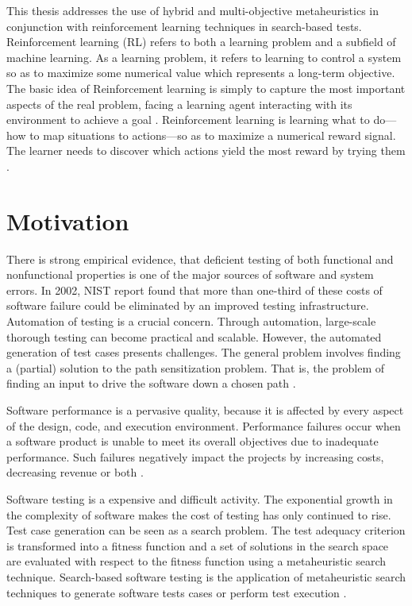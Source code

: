 \documentclass{report}
\begin{document}
This thesis addresses the use of hybrid and multi-objective metaheuristics in conjunction with reinforcement learning techniques in search-based tests. Reinforcement learning (RL) refers to both a learning problem and a subfield of machine learning. As a learning problem, it refers to learning to control a system so as to maximize some numerical value which represents a long-term objective. The basic idea of Reinforcement learning  is simply to capture the most important aspects of the real problem, facing a learning agent interacting with its environment to achieve a goal \cite{Sutton2012}. Reinforcement learning is learning what to do—how to map situations to actions—so as to maximize a numerical reward signal. The learner needs to discover which actions yield the most reward by trying them \cite{Sutton2012}.



\section{Motivation}

There is strong empirical evidence, that deficient
testing of both functional and nonfunctional properties
is one of the major sources of software and system errors. In 2002, NIST  report found that more than one-third of these costs of software failure could be eliminated by an improved testing infrastructure.
Automation of testing is a crucial concern. Through
automation, large-scale thorough testing can become
practical and scalable. However, the automated generation of test cases presents challenges. The general problem involves finding a (partial) solution to the path sensitization problem. That is, the problem of finding an input to drive the software down a chosen path \cite{Harman2010} \cite{dean2003managing}. 

Software performance is a pervasive quality, because it is affected by every aspect of the design, code, and execution environment. Performance failures occur when a software product is unable to meet its overall objectives due to inadequate performance. Such failures negatively impact the projects by increasing costs, decreasing revenue or both \cite{Vetoio2011}. 

Software testing is a expensive and difficult activity. The exponential
growth in the complexity of software makes the cost of testing has only continued to rise. Test case generation can be seen as a search problem. The test adequacy criterion is transformed into a fitness function and a set of solutions in the search
space are evaluated with respect to the fitness function using a metaheuristic search technique. Search-based software testing is the application of metaheuristic search techniques to generate software
tests cases or perform test execution \cite{Afzal2009a} \cite{Gay}.
\end{document}
